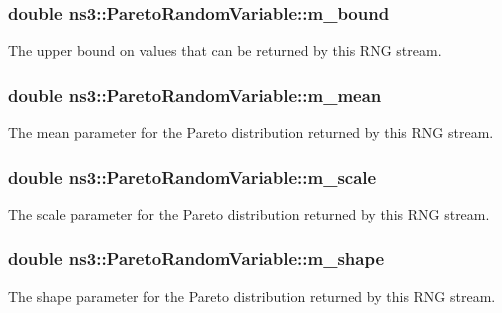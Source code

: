 \subsubsection[{\texorpdfstring{m\+\_\+bound}{m_bound}}]{\setlength{\rightskip}{0pt plus 5cm}double ns3\+::\+Pareto\+Random\+Variable\+::m\+\_\+bound\hspace{0.3cm}{\ttfamily [private]}}\hypertarget{classns3_1_1ParetoRandomVariable_ab9bf62721171d3bc401081cdaa22e1b7}{}\label{classns3_1_1ParetoRandomVariable_ab9bf62721171d3bc401081cdaa22e1b7}
The upper bound on values that can be returned by this R\+NG stream. 
\subsubsection[{\texorpdfstring{m\+\_\+mean}{m_mean}}]{\setlength{\rightskip}{0pt plus 5cm}double ns3\+::\+Pareto\+Random\+Variable\+::m\+\_\+mean\hspace{0.3cm}{\ttfamily [private]}}\hypertarget{classns3_1_1ParetoRandomVariable_a6d245bceabbb307777a942674433ee39}{}\label{classns3_1_1ParetoRandomVariable_a6d245bceabbb307777a942674433ee39}
The mean parameter for the Pareto distribution returned by this R\+NG stream. 
\subsubsection[{\texorpdfstring{m\+\_\+scale}{m_scale}}]{\setlength{\rightskip}{0pt plus 5cm}double ns3\+::\+Pareto\+Random\+Variable\+::m\+\_\+scale\hspace{0.3cm}{\ttfamily [private]}}\hypertarget{classns3_1_1ParetoRandomVariable_a2c52677237cc9bce3c01ea0052444d81}{}\label{classns3_1_1ParetoRandomVariable_a2c52677237cc9bce3c01ea0052444d81}
The scale parameter for the Pareto distribution returned by this R\+NG stream. 
\subsubsection[{\texorpdfstring{m\+\_\+shape}{m_shape}}]{\setlength{\rightskip}{0pt plus 5cm}double ns3\+::\+Pareto\+Random\+Variable\+::m\+\_\+shape\hspace{0.3cm}{\ttfamily [private]}}\hypertarget{classns3_1_1ParetoRandomVariable_a606ababe260201098981f88c30fa8b39}{}\label{classns3_1_1ParetoRandomVariable_a606ababe260201098981f88c30fa8b39}
The shape parameter for the Pareto distribution returned by this R\+NG stream. 

